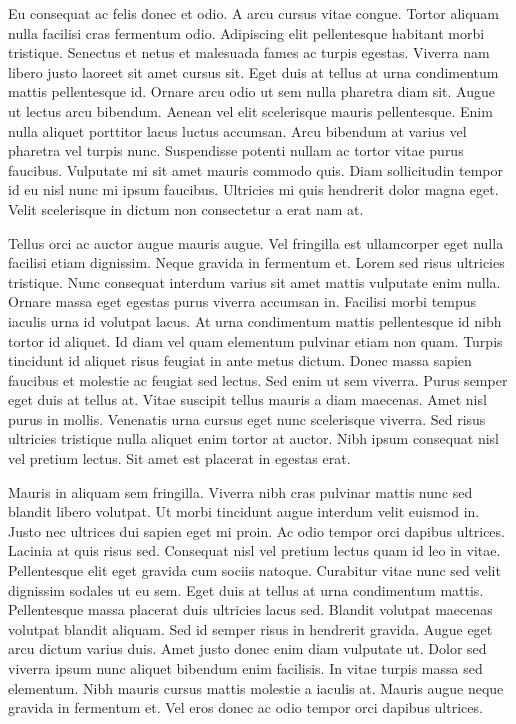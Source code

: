 \documentclass[11pt,a4paper]{article}
\begin{document}
Eu consequat ac felis donec et odio. A arcu cursus vitae congue. Tortor aliquam nulla facilisi cras fermentum odio. Adipiscing elit pellentesque habitant morbi tristique. Senectus et netus et malesuada fames ac turpis egestas. Viverra nam libero justo laoreet sit amet cursus sit. Eget duis at tellus at urna condimentum mattis pellentesque id. Ornare arcu odio ut sem nulla pharetra diam sit. Augue ut lectus arcu bibendum. Aenean vel elit scelerisque mauris pellentesque. Enim nulla aliquet porttitor lacus luctus accumsan. Arcu bibendum at varius vel pharetra vel turpis nunc. Suspendisse potenti nullam ac tortor vitae purus faucibus. Vulputate mi sit amet mauris commodo quis. Diam sollicitudin tempor id eu nisl nunc mi ipsum faucibus. Ultricies mi quis hendrerit dolor magna eget. Velit scelerisque in dictum non consectetur a erat nam at.

Tellus orci ac auctor augue mauris augue. Vel fringilla est ullamcorper eget nulla facilisi etiam dignissim. Neque gravida in fermentum et. Lorem sed risus ultricies tristique. Nunc consequat interdum varius sit amet mattis vulputate enim nulla. Ornare massa eget egestas purus viverra accumsan in. Facilisi morbi tempus iaculis urna id volutpat lacus. At urna condimentum mattis pellentesque id nibh tortor id aliquet. Id diam vel quam elementum pulvinar etiam non quam. Turpis tincidunt id aliquet risus feugiat in ante metus dictum. Donec massa sapien faucibus et molestie ac feugiat sed lectus. Sed enim ut sem viverra. Purus semper eget duis at tellus at. Vitae suscipit tellus mauris a diam maecenas. Amet nisl purus in mollis. Venenatis urna cursus eget nunc scelerisque viverra. Sed risus ultricies tristique nulla aliquet enim tortor at auctor. Nibh ipsum consequat nisl vel pretium lectus. Sit amet est placerat in egestas erat.

Mauris in aliquam sem fringilla. Viverra nibh cras pulvinar mattis nunc sed blandit libero volutpat. Ut morbi tincidunt augue interdum velit euismod in. Justo nec ultrices dui sapien eget mi proin. Ac odio tempor orci dapibus ultrices. Lacinia at quis risus sed. Consequat nisl vel pretium lectus quam id leo in vitae. Pellentesque elit eget gravida cum sociis natoque. Curabitur vitae nunc sed velit dignissim sodales ut eu sem. Eget duis at tellus at urna condimentum mattis. Pellentesque massa placerat duis ultricies lacus sed. Blandit volutpat maecenas volutpat blandit aliquam. Sed id semper risus in hendrerit gravida. Augue eget arcu dictum varius duis. Amet justo donec enim diam vulputate ut. Dolor sed viverra ipsum nunc aliquet bibendum enim facilisis. In vitae turpis massa sed elementum. Nibh mauris cursus mattis molestie a iaculis at. Mauris augue neque gravida in fermentum et. Vel eros donec ac odio tempor orci dapibus ultrices.
\end{document}

